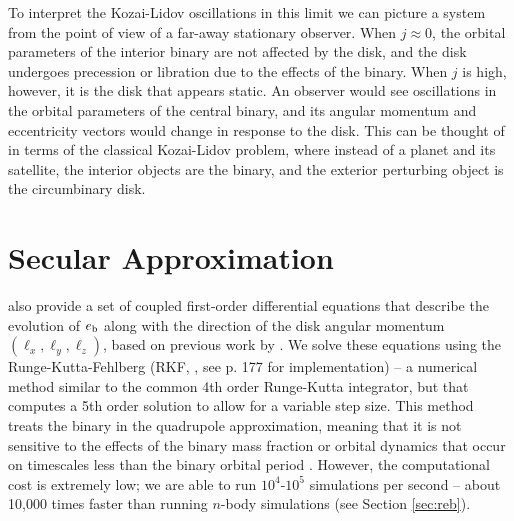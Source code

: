 \documentclass[twocolumn,linenumbers]{aastex631}
\begin{document}
To interpret the Kozai-Lidov oscillations in this limit we can picture a system from the point of view of a far-away stationary observer. When $j \approx 0$, the orbital parameters of the interior binary are not affected by the disk, and the disk undergoes precession or libration due to the effects of the binary. When $j$ is high, however, it is the disk that appears static. An observer would see oscillations in the orbital parameters of the central binary, and its angular momentum and eccentricity vectors would change in response to the disk. This can be thought of in terms of the classical Kozai-Lidov problem, where instead of a planet and its satellite, the interior objects are the binary, and the exterior perturbing object is the circumbinary disk.

\section{Secular Approximation}
\label{sec:rk}
\citet[Equations (7-10)]{martin2019} also provide a set of coupled first-order differential equations that describe the evolution of $e_{\rm b}$ along with the direction of the disk angular momentum $(\ell_x, \ell_y, \ell_z)$, based on previous work by \citet{farago2010}. We solve these equations using the Runge-Kutta-Fehlberg (RKF, \citealt{fehlberg1969}, see \citealt{hairer2000} p. 177 for implementation) -- a numerical method similar to the common 4th order Runge-Kutta integrator, but that computes a 5th order solution to allow for a variable step size. This method treats the binary in the quadrupole approximation, meaning that it is not sensitive to the effects of the binary mass fraction or orbital dynamics that occur on timescales less than the binary orbital period \citep[e.g.][]{naoz2016}. However, the computational cost is extremely low; we are able to run $10^4$-$10^5$ simulations per second -- about 10,000 times faster than running $n$-body simulations (see Section \ref{sec:reb}).
\end{document}
